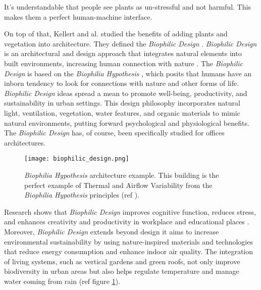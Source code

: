 It's understandable that people see plants as un-stressful and not harmful. This makes them a perfect human-machine interface.


On top of that, Kellert and al. studied the benefits of adding plants and vegetation into architecture. They defined the \textit{Biophilic Design} \cite{kellertBiophilicDesignTheory2008}.
\textit{Biophilic Design} is an architectural and design approach that integrates natural elements into built environments, increasing human connection with nature \cite{downtonBiophilicDesignApplications2017}. The \textit{Biophilic Design} is based on the \textit{Biophilia Hypothesis} \cite{kellertBiophiliaHypothesis}, which posits that humans have an inborn tendency to look for connections with nature and other forms of life. \textit{Biophilic Design} ideas spread a mean to promote well-being, productivity, and sustainability in urban settings. This design philosophy incorporates natural light, ventilation, vegetation, water features, and organic materials to mimic natural environments, putting forward psychological and physiological benefits. The \textit{Biophilic Design} has, of course, been specifically studied for offices architectures.

\begin{figure}[h!]
    \centering
    \texttt{[image: biophilic\_design.png]}
    \caption{\textit{Biophilia Hypothesis} architecture example. This building is the perfect example of Thermal and Airﬂow Variability from the \textit{Biophilia Hypothesis} principles (ref \citet{ryanBiophilicDesign2018a}).}
    \vspace{0.1cm}
    \label{fig:biophilic_design}
\end{figure}


Research shows that \textit{Biophilic Design} improves cognitive function, reduces stress, and enhances creativity and productivity in workplace and educational places \cite{kellert2015practice}. Moreover, \textit{Biophilic Design} extends beyond design it aims to increase environmental sustainability by using nature-inspired materials and technologies that reduce energy consumption and enhance indoor air quality. The integration of living systems, such as vertical gardens and green roofs, not only improve biodiversity in urban areas but also helps regulate temperature and manage water coming from rain \cite{ryanBiophilicDesign2018a} (ref figure \ref{fig:biophilic_design}).

